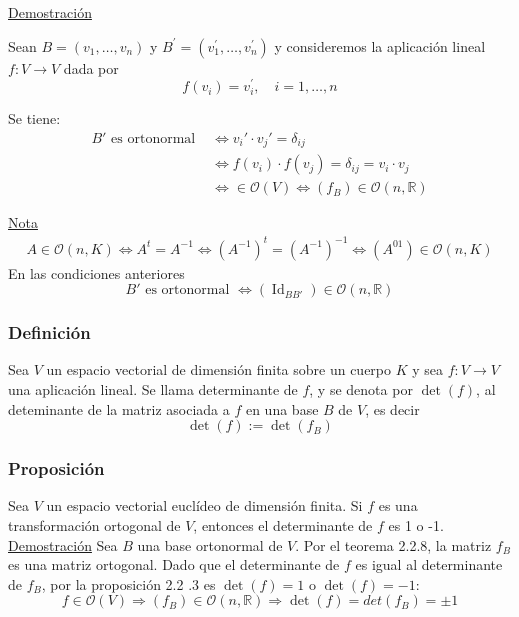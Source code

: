 \documentclass[12pt, a4paper, ones, notitlepage, openany,titlepage]{article}
\newcommand{\demostracion}{\noindent\underline{Demostración}}
\begin{document}
\demostracion

Sean $B=\left(v_{1}, \ldots, v_{n}\right)$ y $B^{\prime}=\left(v_{1}^{\prime}, \ldots, v_{n}^{\prime}\right)$ y consideremos la aplicación lineal $f: V \rightarrow V$ dada por
$$
f\left(v_{i}\right)=v_{i}^{\prime}, \quad i=1, \ldots, n
$$

\noindent Se tiene:
$$
\begin{aligned}
	B' \text{ es ortonormal } & \Longleftrightarrow v_i' \cdot v_j' = \delta_{ij} \\
	& \Longleftrightarrow f(v_i) \cdot f(v_j) = \delta_{ij} = v_i \cdot v_j \\
	& \Longleftrightarrow \in \mathcal{O} (V) \Longleftrightarrow (f_B) \in \mathcal{O} (n, \mathbb{R})
\end{aligned}
$$

\noindent\underline{Nota}
$$
\begin{aligned}
	A \in \mathcal{O} (n,K) \Longleftrightarrow A^t = A^{-1} \Longleftrightarrow (A^{-1})^t = (A^{-1})^{-1} \Longleftrightarrow (A^{01}) \in \mathcal{O} (n,K)
\end{aligned}
$$
\noindent En las condiciones anteriores
$$
B' \text{ es ortonormal } \Longleftrightarrow (\operatorname{Id}_{BB'}) \in \mathcal{O} (n, \mathbb{R})
$$

\subsubsection{Definición}
Sea $V$ un espacio vectorial de dimensión finita sobre un cuerpo $K$ y sea $f: V \rightarrow V$ una aplicación lineal. Se llama determinante de $f$, y se denota por $\operatorname{det}(f)$, al deteminante de la matriz asociada a $f$ en una base $B$ de $V$, es decir
$$
\operatorname{det}(f):=\operatorname{det}\left(f_{B}\right)
$$

\subsubsection{Proposición}
Sea $V$ un espacio vectorial euclídeo de dimensión finita. Si $f$ es una transformación ortogonal de $V$, entonces el determinante de $f$ es 1 o -1.\\

\demostracion
Sea $B$ una base ortonormal de $V$. Por el teorema 2.2.8, la matriz $f_{B}$ es una matriz ortogonal. Dado que el determinante de $f$ es igual al determinante de $f_{B}$, por la proposición 2.2 .3 es $\operatorname{det}(f)=1$ o $\operatorname{det}(f)=-1$:
$$
f \in \mathcal{O} (V) \Longrightarrow (f_B) \in \mathcal{O} (n, \mathbb{R}) \Longrightarrow \operatorname{det} (f) = det(f_B) = \pm 1
$$
\end{document}
